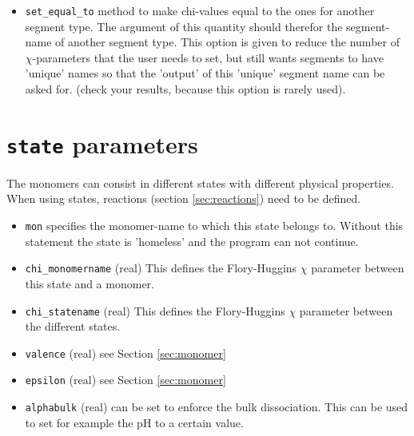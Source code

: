 \documentclass{article}
\begin{document}
\begin{itemize}
\item{\tt set\_equal\_to} method to make chi-values equal to the ones for another segment type. The argument of this quantity should therefor the segment-name of another segment type. This option is given to reduce the number of $\chi$-parameters that the user needs to set, but still wants segments to have 'unique' names so that the 'output' of this 'unique' segment name can be asked for. (check your results, because this option is rarely used). 

\end {itemize}

\section{{\tt state} parameters}
\label{sec:state}

The monomers can consist in different states with different physical properties. When using states, reactions (section \ref{sec:reactions}) need to be defined.

\begin{itemize}

\item {\tt mon} specifies the monomer-name to which this state belongs to. Without this statement the state is 'homeless' and the program can not continue. 

\item {\tt chi\_monomername} (real) This defines the Flory-Huggins $\chi$ parameter between this state and a monomer.

\item {\tt chi\_statename} (real) This defines the Flory-Huggins  $\chi$ parameter between the different states.

\item {\tt valence} (real) see Section \ref{sec:monomer} 

\item {\tt epsilon} (real) see Section \ref{sec:monomer}

\item {\tt alphabulk} (real) can be set to enforce the bulk dissociation.  This can be used to set for example the pH to a certain value.


\end{itemize}
\end{document}
